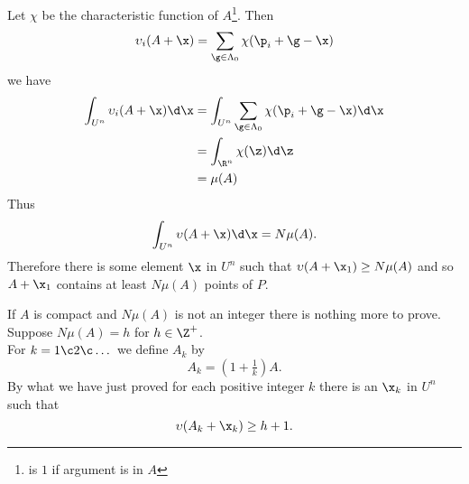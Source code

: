 Let $\chi$ be the characteristic function of $A$\footnote{is $1$ if argument is in $A$}.  Then
\[ \upsilon_i(A+\x) = \sum_{\g\in\Lambda_0}\chi(\p_i+\g-\x) \]
we have
\begin{align*}
\int_{U^n} \upsilon_i (A+\x)\d\x &= \int_{U^n}\sum_{\g\in\Lambda_0}\chi(\p_i+\g-\x)\d\x \\
&= \int_{\R^n}\chi(\z)\d\z \\
&= \mu(A)
\end{align*}
Thus
\[ \int_{U^n} \upsilon(A+\x)\d\x = N\mu(A) . \]
Therefore there is some element $\x$ in $U^n$ such that $\upsilon(A+\x_1)\geq N\mu(A)$ and so $A+\x_1$ contains at least $N\mu(A)$ points of $P$.

If $A$ is compact and $N\mu(A)$ is not an integer there is nothing more to prove.  Suppose $N\mu(A)=h$ for $h\in\Z^+$. \\
For $k=1\c 2\c \dotsc$ we define $A_k$ by
\[ A_k = (1+\tfrac1k)A . \]
By what we have just proved for each positive integer $k$ there is an $\x_k$ in $U^n$ such that
\[ \upsilon(A_k+\x_k) \geq h + 1 . \]
\vspace{-\baselineskip}